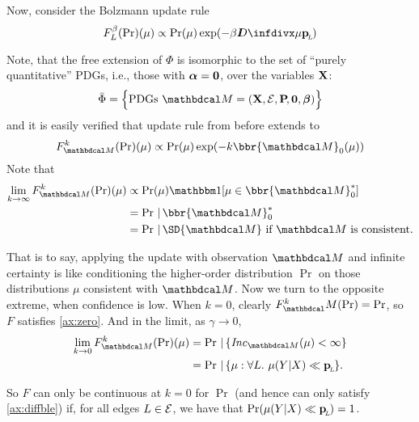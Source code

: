 \documentclass{article}
\begin{document}
Now, consider the Bolzmann update rule
\[
    F_L^{\beta}(\Pr) (\mu) \propto \Pr(\mu) \exp(-\beta \kldiv\mu \bp)
\]

Note, that the free extension of $\Phi$ is isomorphic to the set of ``purely quantitative'' PDGs, i.e., those with $\boldsymbol\alpha = \mathbf{0}$, over the variables $\mathbf{X}$:
$$
    \bar\Phi = \Big\{ \text{PDGs}~\dg M = (\mat X, \Ed, \bP[], \mat0, \bbeta) \Big\}
$$
and it is easily verified that update rule from before extends to 
\[
    F_{\dg M}^k(\Pr)(\mu) \propto \Pr(\mu) \exp(- k \bbr{\dg M}_0(\mu))
\]
Note that
\begin{align*}
    \lim_{k \to \infty} F_{\dg M}^k(\Pr)(\mu) &\propto
        \Pr(\mu) \mathbbm1[\mu \in {\bbr{\dg M}^*_0}] \\
        &= \Pr \,|\, \bbr{\dg M}^*_0 \\
        &= \Pr \,|\, \SD{\dg M} \text{~if $\dg M$ is consistent.}
\end{align*}

That is to say, applying the update with observation $\dg M$ and infinite certainty is like conditioning the higher-order distribution $\Pr$ on those distributions $\mu$ consistent with $\dg M$. 
Now we turn to the opposite extreme, when confidence is low. When $k=0$, clearly $F^k_\dg M(\Pr) = \Pr$, so $F$ satisfies \cref{ax:zero}. And in the limit, as $\gamma \to 0$, 
\begin{align*}
    \lim_{k \to 0} F_{\dg M}^k(\Pr)(\mu) &= \Pr \,|\, \{ \Inc_{\dg M}(\mu) < \infty \} \\
        &= \Pr \,|\, \{\mu : \forall L.~\mu(Y|X) \ll \bp \}.
\end{align*}

So $F$ can only be continuous at $k=0$ for $\Pr$ (and hence can only satisfy \cref{ax:diffble}) if, for all edges $L \in \mathcal E$, we have that $\Pr(\mu(Y|X) \ll \mathbf{p}_{\!_{L}\!}) = 1$.



\subsubsection{}
\def\tauur{\mathtt{CPD\_UR}}
\end{document}
